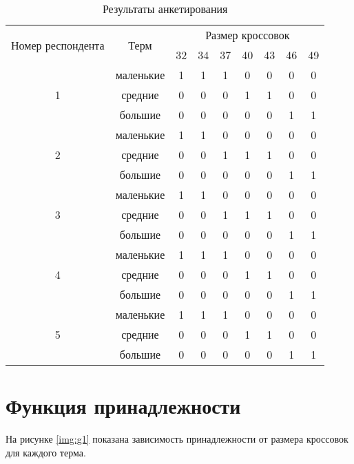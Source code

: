 \begin{table}[h!]
	\centering
	\caption{Результаты анкетирования}
	\begin{tabular}{ |c|c|c|c|c|c|c|c|c| }
		\hline
		\multirow{2}{*}{Номер респондента} & \multirow{2}{*}{Терм} & \multicolumn{7}{c|}{Размер кроссовок} \\
		\cline{3-9}
		&& 32 & 34 & 37 & 40 & 43 & 46 & 49 \\
		\hline
		
		\multirow{3}{*}{1} & маленькие &1&1&1&0&0&0&0  \\
		\cline{2-9}
		& средние &0&0&0&1&1&0&0  \\
		\cline{2-9}
		& большие &0&0&0&0&0&1&1  \\
		\hline
		
		\multirow{3}{*}{2} & маленькие &1&1&0&0&0&0&0  \\
		\cline{2-9}
		& средние &0&0&1&1&1&0&0  \\
		\cline{2-9}
		& большие &0&0&0&0&0&1&1  \\		
		\hline
		
		\multirow{3}{*}{3} & маленькие &1&1&0&0&0&0&0  \\
		\cline{2-9}
		& средние &0&0&1&1&1&0&0  \\
		\cline{2-9}
		& большие &0&0&0&0&0&1&1  \\		
		\hline
		
		\multirow{3}{*}{4} & маленькие &1&1&1&0&0&0&0  \\
		\cline{2-9}
		& средние &0&0&0&1&1&0&0  \\
		\cline{2-9}
		& большие &0&0&0&0&0&1&1  \\		
		\hline
		
		\multirow{3}{*}{5} & маленькие &1&1&1&0&0&0&0  \\
		\cline{2-9}
		& средние &0&0&0&1&1&0&0  \\
		\cline{2-9}
		& большие &0&0&0&0&0&1&1  \\		
		\hline
				
	\end{tabular}
	\label{tbl:results}
\end{table}
\clearpage

\section{Функция принадлежности}

На рисунке \ref{img:g1} показана зависимость принадлежности от размера кроссовок для каждого терма.

